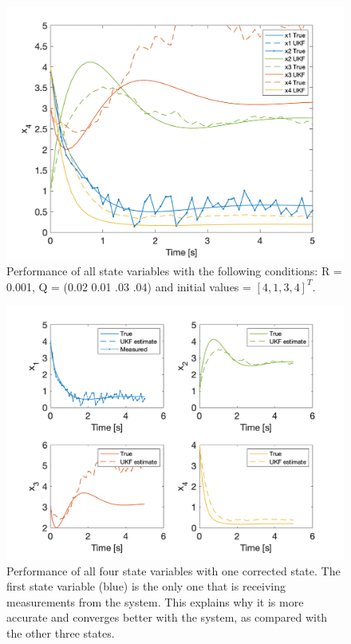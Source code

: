\begin{figure}[h]
    \centering
    \includegraphics[scale = 0.6]{Meskin_overall.png}
    \caption{Performance of all state variables with the following conditions: R = 0.001, Q = (0.02 0.01 .03 .04) and initial values = $[4, 1, 3, 4]^T$.}
\end{figure}




\newpage

\begin{figure}[h]
    \centering
    \includegraphics[scale = 0.6]{Meskin_states.png}
    \caption{Performance of all four state variables with one corrected state. The first state variable (blue) is the only one that is receiving measurements from the system. This explains why it is more accurate and converges better with the system, as compared with the other three states.}
    \label{map}
\end{figure}

